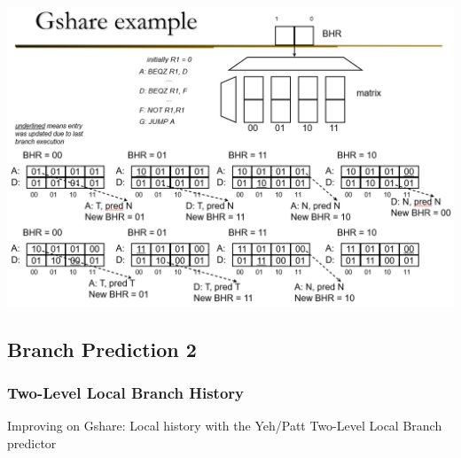 \documentclass[12pt]{extarticle}
\begin{document}
	\begin{center}
		\includegraphics[scale=0.52]{assets/gshare-example.png}
	\end{center}

	\subsection{Branch Prediction 2}

	\subsubsection{Two-Level Local Branch History}

	Improving on Gshare: Local history with the Yeh/Patt Two-Level Local Branch predictor
\end{document}
